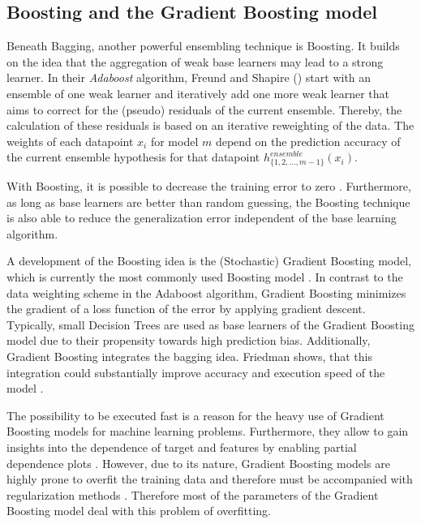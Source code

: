 \documentclass[12pt]{article}
\begin{document}
\subsection{Boosting and the Gradient Boosting model}
Beneath Bagging, another powerful ensembling technique is Boosting. It builds on the idea that the aggregation of weak base learners may lead to a strong learner. In their \textit{Adaboost} algorithm, Freund and Shapire (\citeyear{freund1996experiments}) start with an ensemble of one weak learner and iteratively add one more weak learner that aims to correct for the (pseudo) residuals of the current ensemble. Thereby, the calculation of these residuals is based on an iterative reweighting of the data. The weights of each datapoint $x_{i}$ for model $m$ depend on the prediction accuracy of the current ensemble hypothesis for that datapoint $h^{ensemble}_{\{1,2,...,m-1\}}(x_{i})$. 

With Boosting, it is possible to decrease the training error to zero \citep[p.11ff.]{freund1996experiments}. Furthermore, as long as base learners are better than random guessing, the Boosting technique is also able to reduce the generalization error independent of the base learning algorithm.

A development of the Boosting idea is the (Stochastic) Gradient Boosting model, which is currently the most commonly used Boosting model \citep{friedman2001greedy, friedman2002stochastic}. In contrast to the data weighting scheme in the Adaboost algorithm, Gradient Boosting minimizes the gradient of a loss function of the error by applying gradient descent. Typically, small Decision Trees are used as base learners of the Gradient Boosting model due to their propensity towards high prediction bias. Additionally, Gradient Boosting integrates the bagging idea. Friedman shows, that this integration could substantially improve accuracy and execution speed of the model \citep{friedman2002stochastic}.

The possibility to be executed fast is a reason for the heavy use of Gradient Boosting models for machine learning problems. Furthermore, they allow to gain insights into the dependence of target and features by enabling partial dependence plots \citep[p.1219ff.]{friedman2001greedy}. However, due to its nature, Gradient Boosting models are highly prone to overfit the training data and therefore must be accompanied with regularization methods \citep[p.1203]{friedman2002stochastic}. Therefore most of the parameters of the Gradient Boosting model deal with this problem of overfitting.
\end{document}
